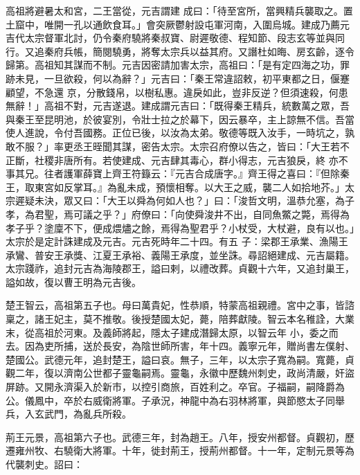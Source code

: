 \begin{pinyinscope}
 高祖將避暑太和宮，二王當從，元吉謂建
 成曰：「待至宮所，當興精兵襲取之。置土窟中，唯開一孔以通飲食耳。」會突厥鬱射設屯軍河南，入圍烏城。建成乃薦元吉代太宗督軍北討，仍令秦府驍將秦叔寶、尉遲敬德、程知節、段志玄等並與同行。又追秦府兵帳，簡閱驍勇，將奪太宗兵以益其府。又譖杜如晦、房玄齡，逐令歸第。高祖知其謀而不制。元吉因密請加害太宗，高祖曰：「是有定四海之功，罪跡未見，一旦欲殺，何以為辭？」元吉曰：「秦王常違詔敕，初平東都之日，偃蹇顧望，不急還
 京，分散錢帛，以樹私惠。違戾如此，豈非反逆？但須速殺，何患無辭！」高祖不對，元吉遂退。建成謂元吉曰：「既得秦王精兵，統數萬之眾，吾與秦王至昆明池，於彼宴別，令壯士拉之於幕下，因云暴卒，主上諒無不信。吾當使人進說，令付吾國務。正位已後，以汝為太弟。敬德等既入汝手，一時坑之，孰敢不服？」率更丞王晊聞其謀，密告太宗。太宗召府僚以告之，皆曰：「大王若不正斷，社稷非唐所有。若使建成、元吉肆其毒心，群小得志，元吉狼戾，終
 亦不事其兄。往者護軍薛寶上齊王符籙云：『元吉合成唐字。』齊王得之喜曰：『但除秦王，取東宮如反掌耳。』為亂未成，預懷相奪。以大王之威，襲二人如拾地芥。」太宗遲疑未決，眾又曰：「大王以舜為何如人也？」曰：「浚哲文明，溫恭允塞，為子孝，為君聖，焉可議之乎？」府僚曰：「向使舜浚井不出，自同魚鱉之斃，焉得為孝子乎？塗廩不下，便成煨燼之餘，焉得為聖君乎？小杖受，大杖避，良有以也。」太宗於是定計誅建成及元吉。元吉死時年二十四。有五
 子：梁郡王承業、漁陽王承鸞、普安王承獎、江夏王承裕、義陽王承度，並坐誅。尋詔絕建成、元吉屬籍。太宗踐祚，追封元吉為海陵郡王，謚曰剌，以禮改葬。貞觀十六年，又追封巢王，謚如故，復以曹王明為元吉後。



 楚王智云，高祖第五子也。母曰萬貴妃，性恭順，特蒙高祖親禮。宮中之事，皆諮稟之，諸王妃主，莫不推敬。後授楚國太妃，薨，陪葬獻陵。智云本名稚詮，大業末，從高祖於河東。及義師將起，隱太子建成潛歸太原，以智云年
 小，委之而去。因為吏所捕，送於長安，為陰世師所害，年十四。義寧元年，贈尚書左僕射、楚國公。武德元年，追封楚王，謚曰哀。無子，三年，以太宗子寬為嗣。寬薨，貞觀二年，復以濟南公世都子靈龜嗣焉。靈龜，永徽中歷魏州刺史，政尚清嚴，奸盜屏跡。又開永濟渠入於新市，以控引商旅，百姓利之。卒官。子福嗣，嗣降爵為公。儀鳳中，卒於右威衛將軍。子承況，神龍中為右羽林將軍，與節愍太子同舉兵，入玄武門，為亂兵所殺。



 荊王元景，高祖第六子也。武德三年，封為趙王。八年，授安州都督。貞觀初，歷遷雍州牧、右驍衛大將軍。十年，徙封荊王，授荊州都督。十一年，定制元景等為代襲刺史。詔曰：




\end{pinyinscope}
